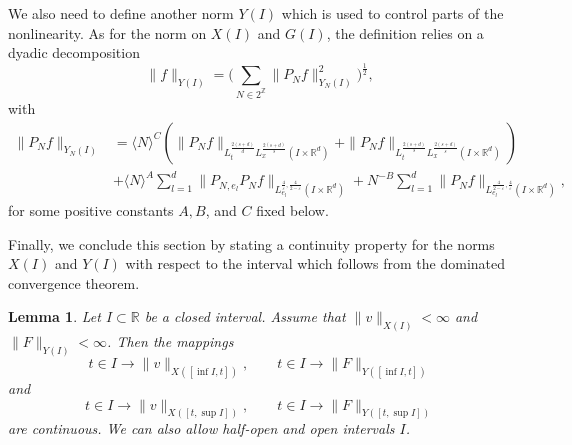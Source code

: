 \documentclass[10pt,leqno]{amsart}
\newtheorem{lem}[thm]{Lemma}
\newcommand{\R}{\mathbb{R}}
\numberwithin{equation}{section}
\newcommand{\Z}{\mathbb{Z}}
\begin{document}
We also need to define another norm $Y(I)$ which is used to control parts of the nonlinearity. As for the norm on $X(I)$ and $G(I)$, the definition relies on a dyadic decomposition
$$\|f\|_{Y(I)} = \Big(\sum_{N\in 2^{\Z}}  \|P_N f\|_{Y_N(I)}^2\Big)^{\frac{1}{2}},$$
with
\begin{equation}\label{defyn}
\begin{aligned}
\|P_N f\|_{Y_N(I)}&= \langle N\rangle^C \left(\|P_N f\|_{L_t^{\frac{2(s+d)}{d}} L_x^{\frac{2(s+d)}{s}} (I\times \R^d)} +\|P_N f\|_{L_t^{\frac{2(s+d)}{s}} L_x^{\frac{2(s+d)}{s}}(I\times \R^d) } \right)\\
&+\langle N\rangle^A \sum_{l=1}^d \|P_{N,e_l} P_N f \|_{L^{\frac{4}{\varepsilon},\frac{4}{2-\varepsilon}}_{e_l}(I\times \R^d) } +N^{-B} \sum_{l=1}^d \|P_N f\|_{L^{\frac{4}{2-\varepsilon},\frac{4}{\varepsilon}}_{e_l} (I\times \R^d) },  
\end{aligned}
\end{equation}
for some positive constants $A,B$, and $C$ fixed below.



Finally, we conclude this section by stating a continuity property for the norms $X(I)$ and $Y(I)$ with respect to the interval which follows from the dominated convergence theorem.

\begin{lem}
\label{lemcontt}
 Let $I\subset \R$ be a closed interval. Assume that $\|v\|_{X(I)}<\infty $  and $\|F\|_{Y(I)}<\infty$. Then the mappings
$$t\in I \rightarrow \|v\|_{X([\inf I,t])},\qquad t\in I \rightarrow \|F\|_{Y([\inf I,t])}$$
and
$$t\in I \rightarrow \|v\|_{X([t,\sup I])},\qquad t\in I \rightarrow \|F\|_{Y([t,\sup I])}$$
are continuous. We can also allow half-open and open intervals $I$.
\end{lem}
\end{document}
